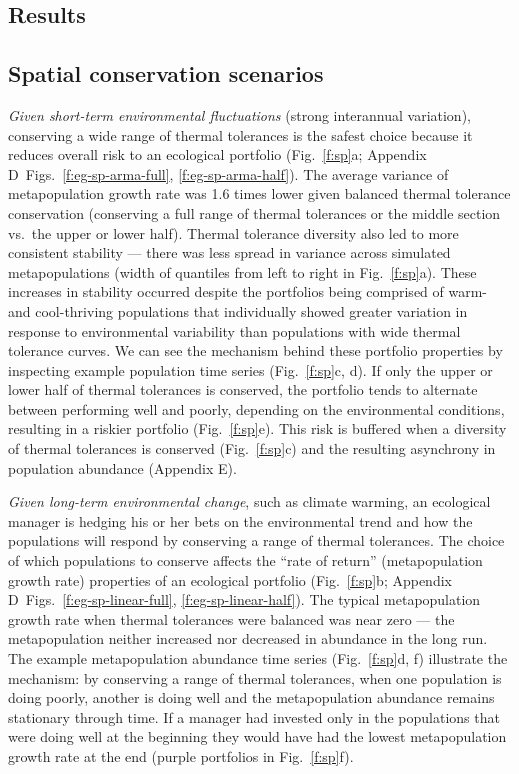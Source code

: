 \documentclass[12pt,english]{article}
\newcommand{\somts}{Appendix D}
\newcommand{\somcor}{Appendix E}
\begin{document}
\begin{spacing}{1.9}
\section{Results}\label{results}

\subsection{Spatial conservation scenarios}\label{spatial-conservation-scenarios}

\emph{Given short-term environmental fluctuations} (strong interannual variation), conserving a wide range of thermal tolerances is the safest choice because it reduces overall risk to an ecological portfolio (Fig.~\ref{f:sp}a; \somts~Figs.~\ref{f:eg-sp-arma-full}, \ref{f:eg-sp-arma-half}). The average variance of metapopulation growth rate was 1.6 times lower given balanced thermal tolerance conservation (conserving a full range of thermal tolerances or the middle section vs.~the upper or lower half). Thermal tolerance diversity also led to more consistent stability --- there was less spread in variance across simulated metapopulations (width of quantiles from left to right in Fig.~\ref{f:sp}a). These increases in stability occurred despite the portfolios being comprised of warm- and cool-thriving populations that individually showed greater variation in response to environmental variability than populations with wide thermal tolerance curves. We can see the mechanism behind these portfolio properties by inspecting example population time series (Fig.~\ref{f:sp}c, d). If only the upper or lower half of thermal tolerances is conserved, the portfolio tends to alternate between performing well and poorly, depending on the environmental conditions, resulting in a riskier portfolio (Fig.~\ref{f:sp}e). This risk is buffered when a diversity of thermal tolerances is conserved (Fig.~\ref{f:sp}c) and the resulting asynchrony in population abundance (\somcor).

\emph{Given long-term environmental change}, such as climate warming, an ecological manager is hedging his or her bets on the environmental trend and how the populations will respond by conserving a range of thermal tolerances. The choice of which populations to conserve affects the ``rate of return'' (metapopulation growth rate) properties of an ecological portfolio (Fig.~\ref{f:sp}b; \somts~Figs.~\ref{f:eg-sp-linear-full}, \ref{f:eg-sp-linear-half}). The typical metapopulation growth rate when thermal tolerances were balanced was near zero --- the metapopulation neither increased nor decreased in abundance in the long run. The example metapopulation abundance time series (Fig.~\ref{f:sp}d, f) illustrate the mechanism: by conserving a range of thermal tolerances, when one population is doing poorly, another is doing well and the metapopulation abundance remains stationary through time. If a manager had invested only in the populations that were doing well at the beginning they would have had the lowest metapopulation growth rate at the end (purple portfolios in Fig.~\ref{f:sp}f).


\end{spacing}
\end{document}
